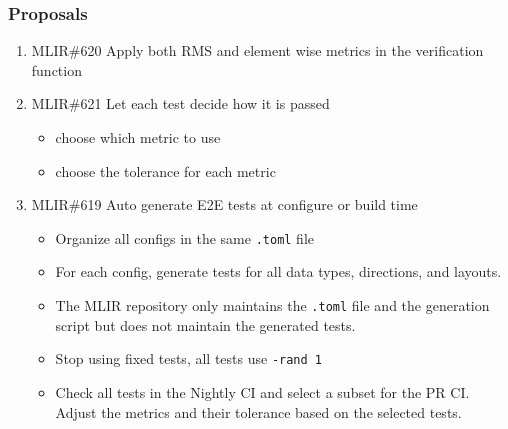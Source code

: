 \documentclass[t, pdftex, aspectratio=169]{beamer}  %
\begin{document}
\begin{frame}
  \frametitle{Proposals}
  \begin{enumerate}
  \item MLIR\#620 Apply both RMS and element wise metrics in the verification function
  \item MLIR\#621 Let each test decide how it is passed
    \begin{itemize}
    \item choose which metric to use
    \item choose the tolerance for each metric
    \end{itemize}
  \item MLIR\#619 Auto generate E2E tests at configure or build time
    \begin{itemize}
    \item Organize all configs in the same \texttt{.toml} file
    \item For each config, generate tests for all data types, directions, and layouts.
    \item The MLIR repository only maintains the \texttt{.toml} file and the generation script
      but does not maintain the generated tests.
    \item Stop using fixed tests, all tests use \texttt{-rand 1}
    \item Check all tests in the Nightly CI and select a subset for the PR CI.
      Adjust the metrics and their tolerance based on the selected tests.
    \end{itemize}
  \end{enumerate}
\end{frame}
\end{document}
